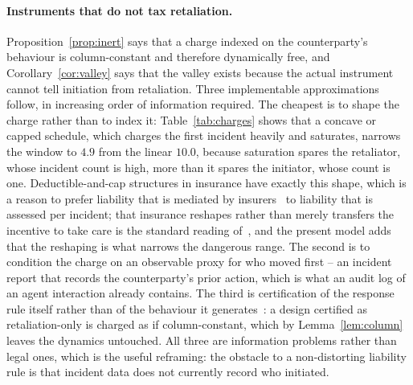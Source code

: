 \documentclass[11pt,a4paper]{article}
\theoremstyle{definition}
\begin{document}
\paragraph{Instruments that do not tax retaliation.}
Proposition~\ref{prop:inert} says that a charge indexed on the counterparty's
behaviour is column-constant and therefore dynamically free, and
Corollary~\ref{cor:valley} says that the valley exists because the actual
instrument cannot tell initiation from retaliation. Three implementable
approximations follow, in increasing order of information required. The
cheapest is to shape the charge rather than to index it: Table~\ref{tab:charges}
shows that a concave or capped schedule, which charges the first incident
heavily and saturates, narrows the window to $4.9$ from the linear $10.0$,
because saturation spares the retaliator, whose incident count is high, more
than it spares the initiator, whose count is one. Deductible-and-cap
structures in insurance have exactly this shape, which is a reason to prefer
liability that is mediated by insurers~\citep{lior2022insuring,trout2025insurance} to liability
that is assessed per
incident; that insurance reshapes rather than merely transfers the incentive
to take care is the standard reading of~\citet{shavell1982insurance}, and the
present model adds that the reshaping is what narrows the dangerous range. The
second is to condition the charge on an observable proxy for who
moved first -- an incident report that records the counterparty's prior
action, which is what an audit log of an agent interaction already contains.
The third is certification of the response rule itself rather than of the
behaviour it generates~\citep{cihon2021certification}: a design certified as
retaliation-only is charged as if column-constant, which by
Lemma~\ref{lem:column} leaves the dynamics untouched. All three are
information problems rather than legal ones, which is the useful reframing:
the obstacle to a non-distorting liability rule is that incident data does not
currently record who initiated.
\end{document}
